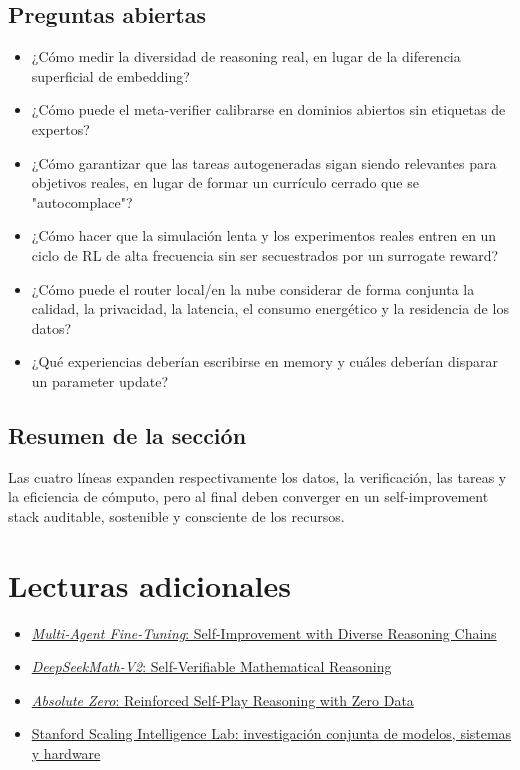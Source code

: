 \documentclass[a4paper]{article}
\begin{document}
\subsection{Preguntas abiertas}

\begin{itemize}
    \item ¿Cómo medir la diversidad de reasoning real, en lugar de la diferencia superficial de embedding?
    \item ¿Cómo puede el meta-verifier calibrarse en dominios abiertos sin etiquetas de expertos?
    \item ¿Cómo garantizar que las tareas autogeneradas sigan siendo relevantes para objetivos reales, en lugar de formar un currículo cerrado que se "autocomplace"?
    \item ¿Cómo hacer que la simulación lenta y los experimentos reales entren en un ciclo de RL de alta frecuencia sin ser secuestrados por un surrogate reward?
    \item ¿Cómo puede el router local/en la nube considerar de forma conjunta la calidad, la privacidad, la latencia, el consumo energético y la residencia de los datos?
    \item ¿Qué experiencias deberían escribirse en memory y cuáles deberían disparar un parameter update?
\end{itemize}

\subsection{Resumen de la sección}

Las cuatro líneas expanden respectivamente los datos, la verificación, las tareas y la eficiencia de cómputo, pero al final deben converger en un self-improvement stack auditable, sostenible y consciente de los recursos.
\section{Lecturas adicionales}

\begin{itemize}
    \item \href{https://arxiv.org/search/?query=Multi-Agent+Fine-Tuning\&searchtype=all}{\emph{Multi-Agent Fine-Tuning}: Self-Improvement with Diverse Reasoning Chains}
    \item \href{https://arxiv.org/search/?query=DeepSeekMath-V2\&searchtype=all}{\emph{DeepSeekMath-V2}: Self-Verifiable Mathematical Reasoning}
    \item \href{https://arxiv.org/search/?query=Absolute+Zero+Reinforced+Self-play+Reasoning+with+Zero+Data\&searchtype=all}{\emph{Absolute Zero}: Reinforced Self-Play Reasoning with Zero Data}
    \item \href{https://scalingintelligence.stanford.edu/}{Stanford Scaling Intelligence Lab: investigación conjunta de modelos, sistemas y hardware}
\end{itemize}
\end{document}
